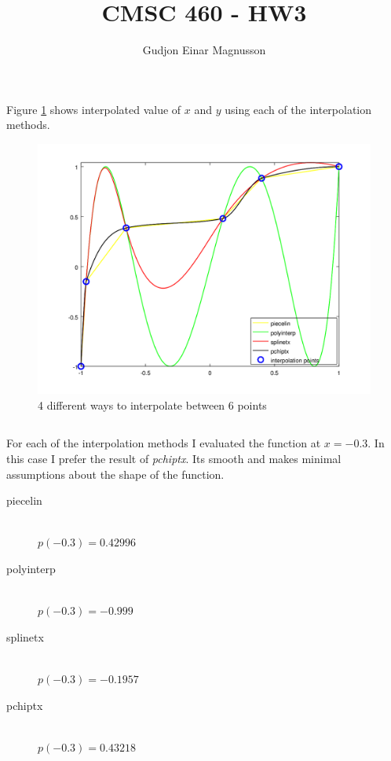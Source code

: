 \documentclass[12pt]{article}
\begin{document}
\title{CMSC 460 - HW3}
\author{Gudjon Einar Magnusson}

\maketitle

\section{} %

\subsection{}

Figure \ref{fig_interp_plot} shows interpolated value of $x$ and $y$ using each of the interpolation methods.

\begin{figure}
    \includegraphics[width=\linewidth]{interp_plot}
    \centering
    \caption{4 different ways to interpolate between 6 points}
    \label{fig_interp_plot}
\end{figure}

\subsection{}

For each of the interpolation methods I evaluated the function at $x = -0.3$. In this case I prefer the result of \textit{pchiptx}. Its smooth and makes minimal assumptions about the shape of the function.
\begin{description}
    \item[piecelin] \hfill \\
    $p(-0.3) = 0.42996$
    \item[polyinterp] \hfill \\
    $p(-0.3) = -0.999$
    \item[splinetx] \hfill \\
    $p(-0.3) = -0.1957$
    \item[pchiptx] \hfill \\
    $p(-0.3) = 0.43218$
\end{description}
\end{document}
